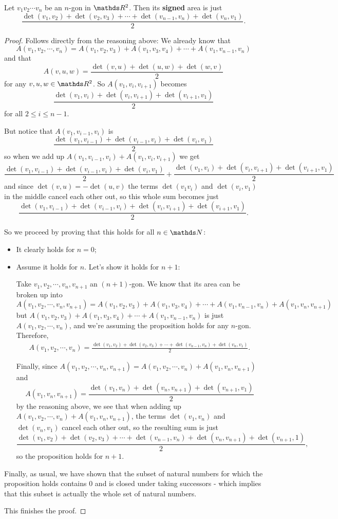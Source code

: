 \begin{lemma}
	Let $v_1v_2\cdots v_n$ be an $n$-gon in $\R^2$. Then its \textbf{signed} area is just
	\[\frac{\det(v_1,v_2)+\det(v_2,v_3)+\cdots+\det(v_{n-1},v_n)+\det(v_n,v_1)}{2}.\]
\end{lemma}
\begin{proof}
	Follows directly from the reasoning above: We already know that 
	\[A(v_1,v_2,\cdots,v_n)=A(v_1,v_2,v_3)+A(v_1,v_3,v_4)+\cdots+A(v_1,v_{n-1},v_n)\]and that
	$$A(v,u,w)=\frac{\det(v,u)+\det(u,w)+\det(w,v)}{2}$$ for any $v,u,w\in \R^2$. So $A(v_1,v_i,v_{i+1})$ becomes
	\[\frac{\det(v_1,v_i)+\det(v_i,v_{i+1})+\det(v_{i+1},v_1)}{2}\]for all $2\leq i\leq n-1$.
	
	But notice that $A(v_1,v_{i-1},v_i)$ is 
	\[\frac{\det(v_1,v_{i-1})+\det(v_{i-1},v_i)+\det(v_i,v_1)}{2}\]so when we add up $A(v_1,v_{i-1},v_i)+A(v_1,v_i,v_{i+1})$ we get
	\[\frac{\det(v_1,v_{i-1})+\det(v_{i-1},v_i)+\det(v_i,v_1)}{2}+\frac{\det(v_1,v_i)+\det(v_i,v_{i+1})+\det(v_{i+1},v_1)}{2}\]and since $\det(v,u)=-\det(u,v)$ the terms $\det(v_1v_i)$ and $\det(v_i,v_1)$ in the middle cancel each other out, so this whole sum becomes just
	\[\frac{\det(v_1,v_{i-1})+\det(v_{i-1},v_i)+\det(v_i,v_{i+1})+\det(v_{i+1},v_1)}{2}.\]
	
	So we proceed by proving that this holds for all $n\in \N$:
	
	\begin{itemize}
		\item It clearly holds for $n=0$;
		\item Assume it holds for $n$. Let's show it holds for $n+1$:
		
		Take $v_1,v_2,\cdots,v_n,v_{n+1}$ an $(n+1)$-gon. We know that its area can be broken up into
		\[A(v_1,v_2,\cdots,v_n,v_{n+1})=A(v_1,v_2,v_3)+A(v_1,v_3,v_4)+\cdots+A(v_1,v_{n-1},v_n)+A(v_1,v_n,v_{n+1})\]but $A(v_1,v_2,v_3)+A(v_1,v_3,v_4)+\cdots+A(v_1,v_{n-1},v_n)$ is just $A(v_1,v_2,\cdots,v_n)$, and we're assuming the proposition holds for any $n$-gon. Therefore, 
		\begin{align*}
			A(v_1,v_2,\cdots,v_n)=\frac{\det(v_1,v_2)+\det(v_2,v_3)+\cdots+\det(v_{n-1},v_n)+\det(v_n,v_1)}{2}.
		\end{align*}
		
		Finally, since $A(v_1,v_2,\cdots,v_n,v_{n+1})=A(v_1,v_2,\cdots,v_n)+A(v_1,v_n,v_{n+1})$ and 
		\[A(v_1,v_n,v_{n+1})=\frac{\det(v_1,v_n)+\det(v_n,v_{n+1})+\det(v_{n+1},v_1)}{2}\]by the reasoning above, we see that when adding up $A(v_1,v_2,\cdots,v_n)+A(v_1,v_n,v_{n+1})$, the terms $\det(v_1,v_n)$ and $\det(v_n,v_1)$ cancel each other out, so the resulting sum is just
		\[\frac{\det(v_1,v_2)+\det(v_2,v_3)+\cdots+\det(v_{n-1},v_n)+\det(v_n,v_{n+1})+\det(v_{n+1},1)}{2},\]so the proposition holds for $n+1$.
	\end{itemize}

Finally, as usual, we have shown that the subset of natural numbers for which the proposition holds contains $0$ and is closed under taking successors - which implies that this subset is actually the whole set of natural numbers.

This finishes the proof.
\end{proof}
